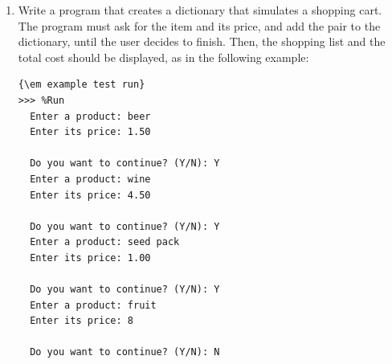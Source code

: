 \documentclass[
  fontsize=10pt,
  a4paper,
]{scrartcl}
\begin{document}
\begin{enumerate}
Write a function  that receives as an argument a dictionary with keys of type string and values of type int, and returns an ASCII histogram that uses the Python output format. An example is below:

\begin{Verbatim}[frame=single]
>>> ascii_histogram(file_to_dic("text.txt"))
             Es +++++++++++++
             un ++++++++++++++++++++++++++++++++++++++++++++++++++++
          hecho +++++++++++++
           hace +++++++++++
         tiempo ++++++++
            que +++++++++++++++++++++++
         lector +++++++++
           mira +++++++++++++
             el +++++++++++
             de ++++++++++++++++++++++++++
          texto +++++++++++++
          sitio +++++++++++
       mientras +++++++++
           que. +++
      contenido ++++++++++
          mira. ++++++++++
\end{Verbatim}

Create a test case to test the function  that returns as expected result:

\begin{Verbatim}[frame=single]
>>> ascii_histogram(dic)
              0 
              1 +
              2 ++
              3 +++
              4 ++++
              5 +++++
              6 ++++++
              7 +++++
              8 ++++
              9 +++
             10 ++
             11 +
\end{Verbatim}

\item Write a program that creates a dictionary that simulates a shopping cart. The program must ask for the item and its price, and add the pair to the dictionary, until the user decides to finish. Then, the shopping list and the total cost should be displayed, as in the following example:
\begin{small}
\begin{Verbatim}[frame=single]{\em example test run}
>>> %Run 
  Enter a product: beer
  Enter its price: 1.50
  
  Do you want to continue? (Y/N): Y
  Enter a product: wine
  Enter its price: 4.50
  
  Do you want to continue? (Y/N): Y
  Enter a product: seed pack
  Enter its price: 1.00
  
  Do you want to continue? (Y/N): Y
  Enter a product: fruit
  Enter its price: 8
  
  Do you want to continue? (Y/N): N
  

\end{Verbatim}
\end{small}
\end{enumerate}
\end{document}
